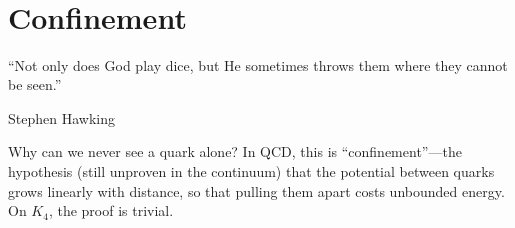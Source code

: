 \documentclass[11pt,a4paper]{book}
\begin{document}
\begin{code}
%
\>[2]\AgdaSymbol{(}\AgdaSpace{}%
\AgdaSpace{}%
\AgdaSymbol{(}\AgdaSpace{}%
\AgdaSpace{}%
\AgdaSpace{}%
\AgdaSpace{}%
\AgdaSymbol{)}\AgdaSpace{}%
\AgdaSpace{}%
\AgdaSymbol{)}\AgdaSpace{}%
\<%
\\
%
\>[2]\AgdaSymbol{(}\AgdaSpace{}%
\AgdaSpace{}%
\AgdaSymbol{(}\AgdaSpace{}%
\AgdaSpace{}%
\AgdaSpace{}%
\AgdaSpace{}%
\AgdaSymbol{)}\AgdaSpace{}%
\AgdaSpace{}%
\AgdaSymbol{)}\<%
\\
\>[0]\AgdaSpace{}%
\AgdaSymbol{=}\<%
\\
\>[0][@{}l@{\AgdaIndent{0}}]%
\>[2]\AgdaSpace{}%
\AgdaOperator{\AgdaInductiveConstructor{,}}\<%
\\
%
\>[2]\AgdaSymbol{(}\AgdaSpace{}%
\AgdaOperator{\AgdaInductiveConstructor{,}}\<%
\\
%
\>[2]\AgdaSymbol{(}\AgdaSpace{}%
\AgdaOperator{\AgdaInductiveConstructor{,}}\<%
\\
%
\>[2]\AgdaSymbol{))}\<%
\end{code}

\chapter{Confinement}
\label{ch:confinement}

\epigraph{``Not only does God play dice, but He sometimes throws them where they cannot be seen.''}{Stephen Hawking}

Why can we never see a quark alone? In QCD, this is ``confinement''---the hypothesis (still unproven in the continuum) that the potential between quarks grows linearly with distance, so that pulling them apart costs unbounded energy. On $K_4$, the proof is trivial.
\end{document}

